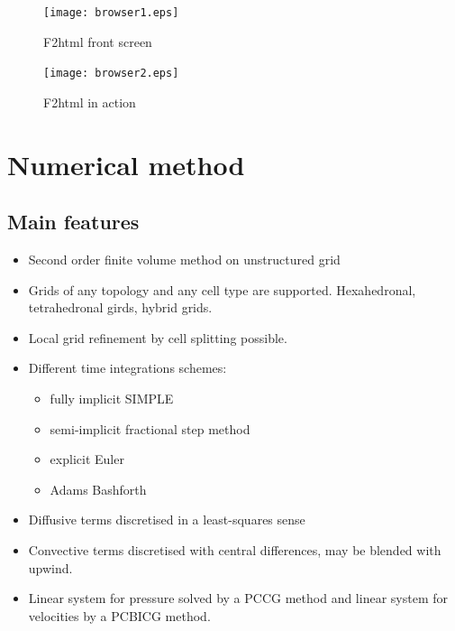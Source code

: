 \documentclass[10pt]{article}
\begin{document}
    \begin{figure}
    \centering
    \texttt{[image: browser1.eps]}
    \caption{F2html front screen}
    \label{browser1}
    \end{figure}

    \begin{figure}
    \centering
    \texttt{[image: browser2.eps]}
    \caption{F2html in action}
    \label{browser2}
    \end{figure}


%
    \clearpage
    \newpage
    \section{Numerical method}
%

    \subsection{Main features}

    \begin{itemize}
    \item Second order finite volume method on unstructured grid
    \item Grids of any topology and any cell type are supported.
          Hexahedronal, tetrahedronal girds, hybrid grids.  
    \item Local grid refinement by cell splitting possible. 
    \item Different time integrations schemes: 
    \begin{itemize}
       \item fully implicit SIMPLE
       \item semi-implicit fractional step method  
       \item explicit Euler
       \item Adams Bashforth
    \end{itemize}
    \item Diffusive terms discretised in a least-squares sense
    \item Convective terms discretised with central differences,
          may be blended with upwind. 
    \item Linear system for pressure solved by a PCCG method
          and linear system for velocities by a PCBICG method.  
    \end{itemize}
\end{document}
